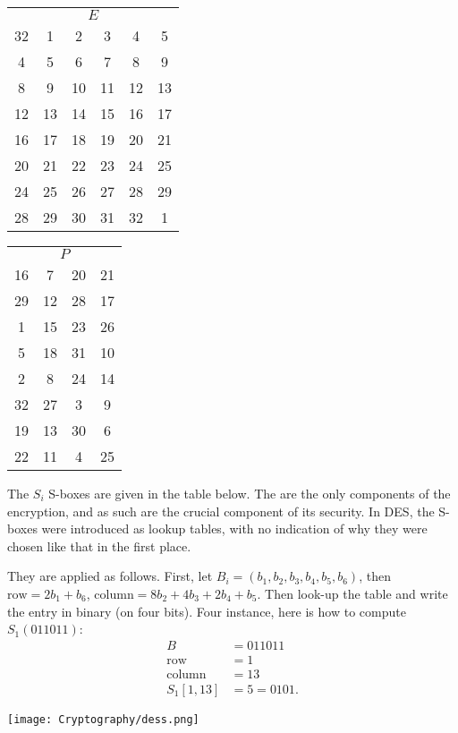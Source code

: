 \documentclass[a4paper, 11pt, openany]{book}
\begin{document}
\begin{tabular}{cccccc}
\multicolumn{6}{c}{$E$}\\
32 & 1 & 2 & 3 & 4 & 5\\
4 & 5 & 6 & 7 & 8 & 9\\
8 & 9 & 10 & 11 & 12 & 13\\
12 & 13 & 14 & 15 & 16 & 17\\
16 & 17 & 18 & 19 & 20 & 21\\
20 & 21 & 22 & 23 & 24 & 25\\
24 & 25 & 26 & 27 & 28 & 29\\
28 & 29 & 30 & 31 & 32 & 1
\end{tabular}
\hfill
\begin{tabular}{cccc}
\multicolumn{4}{c}{$P$}\\
16 & 7 & 20 & 21\\
29 & 12 & 28 & 17\\
1 & 15 & 23 & 26\\
5 & 18 & 31 & 10\\
2 & 8 & 24 & 14\\
32 & 27 & 3 & 9\\
19 & 13 & 30 & 6\\
22 & 11 & 4 & 25
\end{tabular}

The $S_i$ S-boxes are given in the table below. The  are the only  components of the encryption, and as such are the crucial component of its security. In DES, the S-boxes were introduced as lookup tables, with no indication of why they were chosen like that in the first place.

They are applied as follows. First, let $B_i = (b_1, b_2, b_3, b_4, b_5, b_6)$, then $\text{row} = 2b_1 + b_6$, $\text{column} = 8b_2 + 4b_3 + 2b_4 + b_5$. Then look-up the table and write the entry in binary (on four bits). Four instance, here is how to compute $S_1(011011)$:
\begin{align*}
    B &= 011011\\
    \text{row} &= 1\\
    \text{column} &= 13\\
    S_1[1,13] &= 5 = 0101.
\end{align*}

\begin{center}
    \texttt{[image: Cryptography/dess.png]}
\end{center}
\end{document}
